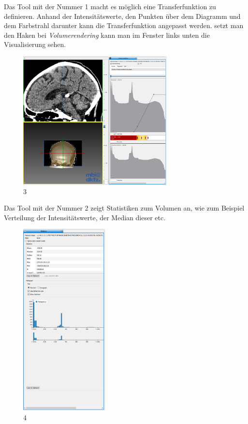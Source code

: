 Das Tool mit der Nummer 1 macht es möglich eine Transferfunktion zu definieren. Anhand der Intensitätswerte, den Punkten über dem Diagramm und dem Farbstrahl darunter kann die Transferfunktion angepasst werden. setzt man den Haken bei \textit{Volumerendering} kann man im Fenster links unten die Visualisierung sehen.

\begin{figure}[H] 
\centering 
\includegraphics[width=0.7\textwidth]{Logos/MITK_Doku/3.PNG}
\caption{3} 
\label{fig:drei} 
\end{figure}

Das Tool mit der Nummer 2 zeigt Statistiken zum Volumen an, wie zum Beispiel Verteilung der Intensitätswerte, der Median dieser etc.

\begin{figure}[H] 
\centering 
\includegraphics[width=0.4\textwidth]{Logos/MITK_Doku/4.PNG}
\caption{4} 
\label{fig:vier} 
\end{figure}

